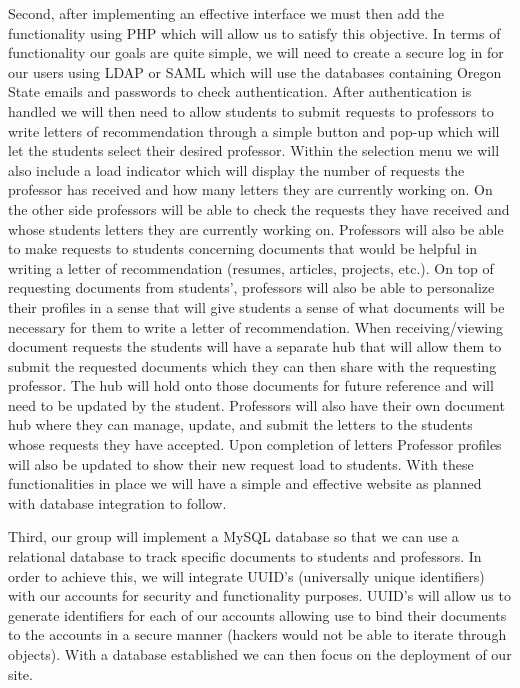 \documentclass[onecolumn, draftclsnofoot,10pt, compsoc]{IEEEtran}
\begin{document}
Second, after implementing an effective interface we must then add the functionality using PHP which will allow us to satisfy this objective. In terms of functionality our goals are quite simple, we will need to create a secure log in for our users using LDAP or SAML which will use the databases containing Oregon State emails and passwords to check authentication. After authentication is handled we will then need to allow students to submit requests to professors to write letters of recommendation through a simple button and pop-up which will let the students select their desired professor. Within the selection menu we will also include a load indicator which will display the number of requests the professor has received and how many letters they are currently working on. On the other side professors will be able to check the requests they have received and whose students letters they are currently working on. Professors will also be able to make requests to students concerning documents that would be helpful in writing a letter of recommendation (resumes, articles, projects, etc.). On top of requesting documents from students’, professors will also be able to personalize their profiles in a sense that will give students a sense of what documents will be necessary for them to write a letter of recommendation.  When receiving/viewing document requests the students will have a separate hub that will allow them to submit the requested documents which they can then share with the requesting professor. The hub will hold onto those documents for future reference and will need to be updated by the student. Professors will also have their own document hub where they can manage, update, and submit the letters to the students whose requests they have accepted. Upon completion of letters Professor profiles will also be updated to show their new request load to students. With these functionalities in place we will have a simple and effective website as planned with database integration to follow.\vspace{4mm}
 
Third, our group will implement a MySQL database so that we can use a relational database to track specific documents to students and professors. In order to achieve this, we will integrate UUID’s (universally unique identifiers) with our accounts for security and functionality purposes. UUID’s will allow us to generate identifiers for each of our accounts allowing use to bind their documents to the accounts in a secure manner (hackers would not be able to iterate through objects). With a database established we can then focus on the deployment of our site.\vspace{4mm}
\end{document}
